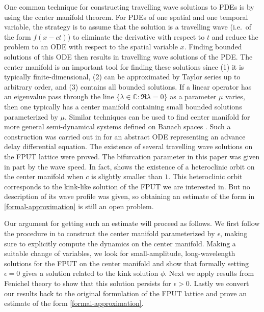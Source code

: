 One common technique for constructing travelling wave solutions to PDEs is by using the center manifold theorem. For PDEs of one spatial and one temporal variable, the strategy is to assume that the solution is a travelling wave (i.e.\ of the form \(f(x-ct)\)) to eliminate the derivative with respect to \(t\) and reduce the problem to an ODE with respect to the spatial variable \(x\). Finding bounded solutions of this ODE then results in travelling wave solutions of the PDE. The center manifold is an important tool for finding these solutions since (1) it is typically finite-dimensional, (2) can be approximated by Taylor series up to arbitrary order, and (3) contains all bounded solutions. If a linear operator has an eigenvalue pass through the line \(\{\lambda\in\mathbb C: \Re \lambda = 0\}\) as a parameter \(\mu\) varies, then one typically has a center manifold containing small bounded solutions parameterized by \(\mu\). Similar techniques can be used to find center manifold for more general semi-dynamical systems defined on Banach spaces \cite{vanderbauwhede1992center}. Such a construction was carried out in \cite{iooss2000travelling} for an abstract ODE representing an advance delay differential equation. The existence of several travelling wave solutions on the FPUT lattice were proved. The bifurcation parameter in this paper was given in part by the wave speed. In fact, \cite[Thm.\ 5]{iooss2000travelling} shows the existence of a heteroclinic orbit on the center manifold when \(c\) is slightly smaller than \(1\). This heteroclinic orbit corresponds to the kink-like solution of the FPUT we are interested in. But no description of its wave profile was given, so obtaining an estimate of the form in \cref{formal-approximation} is still an open problem.


Our argument for getting such an estimate will proceed as follows. We first follow the procedure in \cite{iooss2000travelling}
to construct the center manifold parameterized by \(\epsilon\), making sure to explicitly compute the dynamics on the center manifold. Making a suitable change of variables, we look for small-amplitude, long-wavelength solutions for the FPUT on the center manifold and show that formally setting \(\epsilon = 0\) gives a solution related to the kink solution \(\phi\). Next we apply results from Fenichel theory to show that this solution persists for \(\epsilon> 0\). Lastly we convert our results back to the original formulation of the FPUT lattice and prove an estimate of the form \cref{formal-approximation}.

